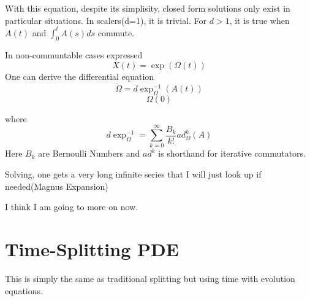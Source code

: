 With this equation, despite its simplisity, closed form solutions only exist in particular situations. In scalers(d=1), it is trivial. For $d > 1$, it is true when $A(t)$ and $\int^t_0 A(s) ds$ commute.

In non-communtable cases expressed
\[
X(t)  = \exp(\Omega(t))
  \]
  One can derive the differential equation
\[
  \dot{\Omega} = d \exp^{-1}_\Omega(A(t))
 \]
\[
\Omega(0)
  \]

  where
\[
    d \exp^{-1}_\Omega = \sum^\infty_{k=0} \frac{B_k}{k!} ad^k_\Omega (A)
  \]
  Here $B_k$ are Bernoulli Numbers and $ad^k$ is shorthand for iterative commutators.

  Solving, one gets a very long infinite series that I will just look up if needed(Magnus Expansion)

  I think I am going to more on now.

\section{Time-Splitting PDE}

This is simply the same as traditional splitting but using time with evolution equations.
